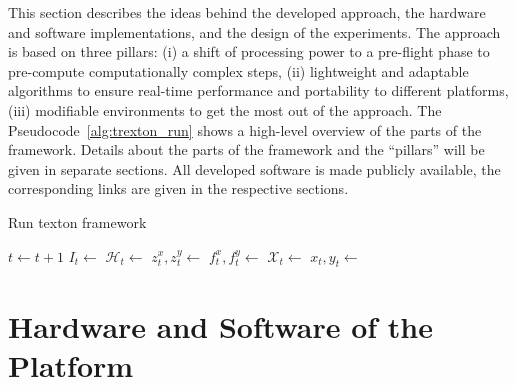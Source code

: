 \documentclass{report}
\begin{document}
This section describes the ideas behind the developed approach, the
hardware and software implementations, and the design of the
experiments.
The approach is based on three pillars: (i) a shift of processing
power to a pre-flight phase to pre-compute computationally complex
steps, (ii) lightweight and adaptable algorithms to ensure real-time
performance and portability to different platforms, (iii) modifiable
environments to get the most out of the approach. The
Pseudocode~\ref{alg:trexton_run} shows a high-level overview of the
parts of the framework. Details about the parts of the framework and
the ``pillars'' will be given in separate sections. All developed
software is made publicly available, the corresponding links are given
in the respective sections.
\begin{algorithm}
    \caption{Run texton framework}
    \label{alg:trexton_run}
    \begin{algorithmic}[1]
       \State $t \gets t+1$ \State
      $I_t \gets$  \State
      $\mathcal{H}_t \gets$ 
      \State $z_t^x, z_t^y \gets$
       \State
      $f_t^x, f_t^y \gets$  \State
      $\mathcal{X}_t \gets$
       \State $x_t, y_t \gets$
       \State
      \EndProcedure
    \end{algorithmic}
  \end{algorithm}  
\section{Hardware and Software of the Platform}
\label{sec:hardware}
\end{document}
